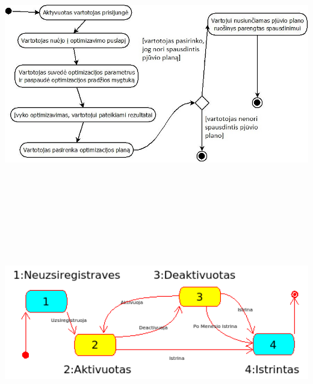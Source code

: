 \documentclass[a4paper,12pt]{article}
\begin{document}
\begin{frame}
\centering
\includegraphics[width=18cm, height=10cm]{swim}

\end{frame}


\begin{frame}
\centering
\includegraphics[width=15cm, height=10cm]{state_diagram.png}

\end{frame}
\end{document}
